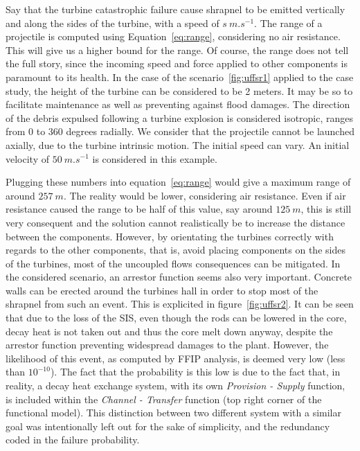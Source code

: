 Say that the turbine catastrophic failure cause shrapnel to be emitted vertically and along the sides of the turbine, with a speed of $s\ m.s^{-1}$. The range of a projectile is computed using Equation~\ref{eq:range}, considering no air resistance. This will give us a higher bound for the range. Of course, the range does not tell the full story, since the incoming speed and force applied to other components is paramount to its health. In the case of the scenario~\ref{fig:uffsr1} applied to the case study, the height of the turbine can be considered to be 2 meters. It may be so to facilitate maintenance as well as preventing against flood damages. The direction of the debris expulsed following a turbine explosion is considered isotropic, ranges from 0 to 360 degrees radially. We consider that the projectile cannot be launched axially, due to the turbine intrinsic motion. The initial speed can vary. An initial velocity of $50\ m.s^{-1}$ is considered in this example.

Plugging these numbers into equation~\ref{eq:range} would give a maximum range of around $257\ m$. The reality would be lower, considering air resistance. Even if air resistance caused the range to be half of this value, say around $125\ m$, this is still very consequent and the solution cannot realistically be to increase the distance between the components. However, by orientating the turbines correctly with regards to the other components, that is, avoid placing components on the sides of the turbines, most of the uncoupled flows consequences can be mitigated. In the considered scenario, an arrestor function seems also very important. Concrete walls can be erected around the turbines hall in order to stop most of the shrapnel from such an event. This is explicited in figure~\ref{fig:uffsr2}. It can be seen that due to the loss of the SIS, even though the rods can be lowered in the core, decay heat is not taken out and thus the core melt down anyway, despite the arrestor function preventing widespread damages to the plant. However, the likelihood of this event, as computed by FFIP analysis, is deemed very low (less than $10^{-10}$). The fact that the probability is this low is due to the fact that, in reality, a decay heat exchange system, with its own \textit{Provision - Supply} function, is included within the \textit{Channel - Transfer} function (top right corner of the functional model). This distinction between two different system with a similar goal was intentionally left out for the sake of simplicity, and the redundancy coded in the failure probability.

